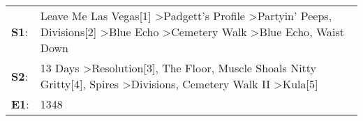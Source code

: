 \begin{supertabular}{p{0.03\textwidth}p{0.92\textwidth}}
 \textbf{S1}:  &  Leave Me Las Vegas[1]\textsuperscript{} \textgreater \enspace Padgett's Profile\textsuperscript{} \textgreater \enspace Partyin' Peeps\textsuperscript{}, \enspace Divisions[2]\textsuperscript{} \textgreater \enspace Blue Echo\textsuperscript{} \textgreater \enspace Cemetery Walk\textsuperscript{} \textgreater \enspace Blue Echo\textsuperscript{}, \enspace Waist Down\textsuperscript{}  \enspace  \\
 \textbf{S2}:  &                                   13 Days\textsuperscript{} \textgreater \enspace Resolution[3]\textsuperscript{}, \enspace The Floor\textsuperscript{}, \enspace Muscle Shoals Nitty Gritty[4]\textsuperscript{}, \enspace Spires\textsuperscript{} \textgreater \enspace Divisions\textsuperscript{}, \enspace Cemetery Walk II\textsuperscript{} \textgreater \enspace Kula[5]\textsuperscript{}  \enspace  \\
 \textbf{E1}:  &                                                                                                                                                                                                                                                                                                                                                                              1348\textsuperscript{}  \enspace  \\
\end{supertabular}
